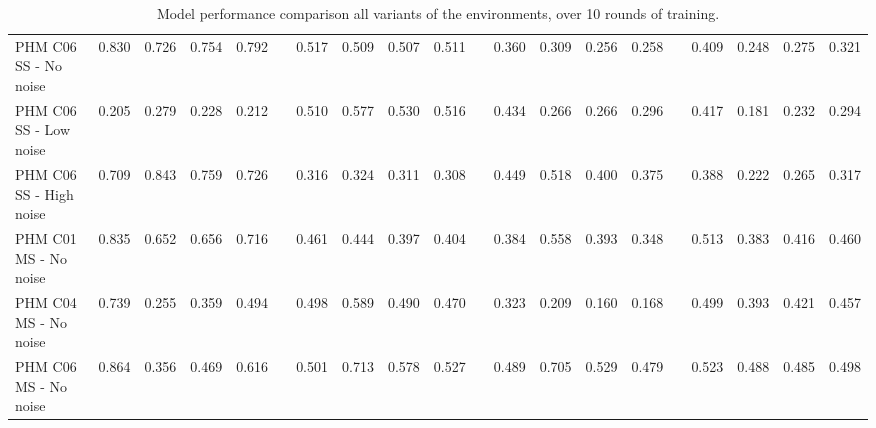 \documentclass[a4paper, 12pt]{article}
\begin{document}
\begin{landscape}
\begin{table}
\begin{tabular}{@{}l rrrr c rrrr c rrrr c rrrr@{}}
			PHM C06 SS - No noise &0.830 &0.726 &0.754 & 0.792 & & 0.517 &0.509 &0.507 &0.511 & &0.360 &0.309 &0.256 &0.258 & &0.409 &0.248 &0.275&0.321\\
			PHM C06 SS - Low noise &0.205 &0.279 &0.228 & 0.212 & & 0.510 &0.577 &0.530 &0.516 & &0.434 &0.266 &0.266 &0.296 & &0.417 &0.181 &0.232&0.294\\
			PHM C06 SS - High noise &0.709 &0.843 &0.759 & 0.726 & & 0.316 &0.324 &0.311 &0.308 & &0.449 &0.518 &0.400 &0.375 & &0.388 &0.222 &0.265&0.317\\ \midrule
			
			PHM C01 MS - No noise &0.835 &0.652 &0.656 & 0.716 & & 0.461 &0.444 &0.397 &0.404 & &0.384 &0.558 &0.393 &0.348 & &0.513 &0.383 &0.416&0.460\\
			PHM C04 MS - No noise &0.739 &0.255 &0.359 & 0.494 & & 0.498 &0.589 &0.490 &0.470 & &0.323 &0.209 &0.160 &0.168 & &0.499 &0.393 &0.421&0.457\\
			PHM C06 MS - No noise &0.864 &0.356 &0.469 & 0.616 & & 0.501 &0.713 &0.578 &0.527 & &0.489 &0.705 &0.529 &0.479 & &0.523 &0.488 &0.485&0.498\\
			
			\bottomrule
		\end{tabular}
		\caption{Model performance comparison all variants of the environments, over 10 rounds of training.}
		\label{tbl:DetailedMetrics}
	\end{table}
\end{landscape}
\restoregeometry %
\end{document}
